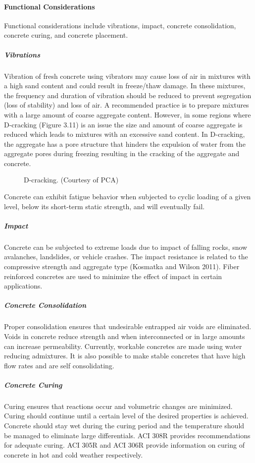 \paragraph{Functional Considerations}
Functional considerations include vibrations, impact, concrete consolidation, concrete curing, and concrete
placement.

\subparagraph{Vibrations}
Vibration of fresh concrete using vibrators may cause loss of air in mixtures with a high sand content and could
result in freeze/thaw damage. In these mixtures, the frequency and duration of vibration should be reduced to
prevent segregation (loss of stability) and loss of air. A recommended practice is to prepare mixtures with a large
amount of coarse aggregate content. However, in some regions where D-cracking (Figure 3.11) is an issue the size
and amount of coarse aggregate is reduced which leads to mixtures with an excessive sand content. In D-cracking,
the aggregate has a pore structure that hinders the expulsion of water from the aggregate pores during freezing
resulting in the cracking of the aggregate and concrete.

\begin{figure}
  \caption{D-cracking. (Courtesy of PCA)}\label{fig:d-cracking}
\end{figure}

Concrete can exhibit fatigue behavior when subjected to cyclic loading of a given level, below its short-term
static strength, and will eventually fail.

\subparagraph{Impact}
Concrete can be subjected to extreme loads due to impact of falling rocks, snow avalanches, landslides, or
vehicle crashes. The impact resistance is related to the compressive strength and aggregate type (Kosmatka and
Wilson 2011). Fiber reinforced concretes are used to minimize the effect of impact in certain applications.


\subparagraph{Concrete Consolidation}
Proper consolidation ensures that undesirable entrapped air voids are eliminated. Voids in concrete reduce
strength and when interconnected or in large amounts can increase permeability. Currently, workable concretes are
made using water reducing admixtures. It is also possible to make stable concretes that have high flow rates and are
self consolidating.

\subparagraph{Concrete Curing}

Curing ensures that reactions occur and volumetric changes are minimized. Curing should continue until a
certain level of the desired properties is achieved. Concrete should stay wet during the curing period and the
temperature should be managed to eliminate large differentials. ACI 308R provides recommendations for adequate
curing. ACI 305R and ACI 306R provide information on curing of concrete in hot and cold weather respectively.

